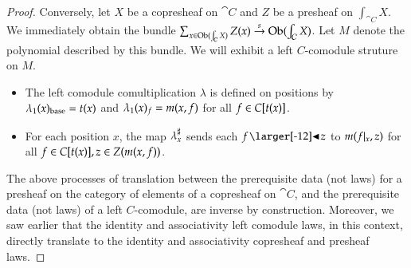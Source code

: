 \documentclass{amsart}
\begin{document}
\begin{proof}
  Conversely, let $X$ be a copresheaf on $\cat{C}$ and $Z$ be a
  presheaf on $\int_{\cat{C}}X$. We immediately obtain the bundle
  ${\sum_{x \in \operatorname{Ob}(\int_{\mathcal{C}}X)}Z(x) \overset{s}{\to}
    \operatorname{Ob}(\int_{\mathcal{C}}X)}$. Let $M$ denote the polynomial described by
  this bundle. We will exhibit a left $C$-comodule struture on $M$.
  \begin{itemize}
  \item The left comodule comultiplication $\lambda$ is defined on
    positions by ${\lambda}_1(x)_{\mathrm{base}} = t(x)$ and
    ${\lambda}_1(x)_f = m(x,f)$ for all ${f \in C[t(x)]}$.
  \item For each position $x$, the map ${\lambda}^\sharp_{x}$ sends each
    $f \subd z$ to $m(f|_{x}, z)$ for all
    ${f \in C[t(x)]}, {z \in Z(m(x,f))}$.
  \end{itemize}

  The above processes of translation between the prerequisite data
  (not laws) for a presheaf on the category of elements of a
  copresheaf on $\cat{C}$, and the prerequisite data (not laws) of a
  left $C$-comodule, are inverse by construction. Moreover, we saw
  earlier that the identity and associativity left comodule
  laws, in this context, directly translate to the identity and
  associativity copresheaf and presheaf laws.
\end{proof}
\end{document}
